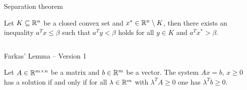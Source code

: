\begin{frame}{Separation theorem}

\begin{theorem}

  Let $K\subseteq\mathbb{R}^n$ be a closed  convex set and $x^* \in \mathbb{R}^n \setminus K$, then there
  exists an inequality $a^Tx ≤ \beta$ such that $a^T y < \beta$ holds for all
  $y \in K$ and $a^Tx^*>\beta$. 
\end{theorem}

  \begin{columns}
    \begin{column}{.5\textwidth}
      
    \end{column}
    \begin{column}{.5\textwidth}
      
    \end{column}       
  \end{columns}
\end{frame}






\begin{frame}{}

  \begin{columns}
    \begin{column}{.5\textwidth}
      
    \end{column}
    \begin{column}{.5\textwidth}
      
    \end{column}       
  \end{columns}
\end{frame}






\begin{frame}{Farkas' Lemma -- Version 1}



\begin{theorem}
  \label{conv:thr:12}
  Let $A \in \mathbb{R}^{m\times n}$ be a matrix and $b \in \mathbb{R}^m$ be a vector. The
  system $Ax = b, \,x\geq0$ has a solution if and only if for all $\lambda \in
  \mathbb{R}^m$ with $\lambda^TA\geq0$ one has $\lambda^Tb \geq0$.  
\end{theorem}
  
  \begin{columns}
    \begin{column}{.5\textwidth}
      
    \end{column}
    \begin{column}{.5\textwidth}
      
    \end{column}       
  \end{columns}
\end{frame}





